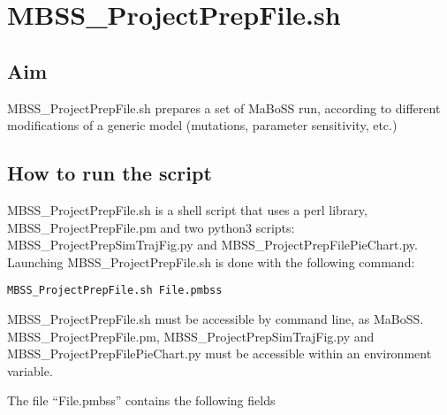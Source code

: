 \documentclass{article}
\begin{document}
\section*{MBSS\_ProjectPrepFile.sh}
\subsection*{Aim}
MBSS\_ProjectPrepFile.sh prepares a set of MaBoSS run, according to different modifications of a generic model (mutations, parameter sensitivity, etc.)

\subsection*{How to run the script}
MBSS\_ProjectPrepFile.sh is a shell script that uses a perl library, MBSS\_ProjectPrepFile.pm and two python3 scripts: MBSS\_ProjectPrepSimTrajFig.py and MBSS\_ProjectPrepFilePieChart.py.
Launching MBSS\_ProjectPrepFile.sh is done with the following command:
\begin{verbatim}
MBSS_ProjectPrepFile.sh File.pmbss
\end{verbatim}

MBSS\_ProjectPrepFile.sh must be accessible by command line, as MaBoSS. MBSS\_ProjectPrepFile.pm, MBSS\_ProjectPrepSimTrajFig.py and MBSS\_ProjectPrepFilePieChart.py
must be accessible within an environment variable.

The file ``File.pmbss'' contains the following fields
\end{document}
